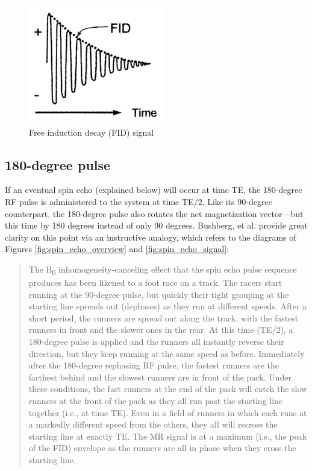 \documentclass[12pt]{article} %
\begin{document}
\begin{figure}[h]
\centering
\includegraphics[scale=1.0]{./images/fid.png}
\caption{Free induction decay (FID) signal \cite{bushberg2002}}
\label{fig:fid}
\end{figure}

\subsection{180-degree pulse}
If an eventual spin echo (explained below) will occur at time TE, the 180-degree RF pulse is administered to the system at time TE/2. Like its 90-degree counterpart, the 180-degree pulse also rotates the net magnetization vector---but this time by 180 degrees instead of only 90 degrees. Bushberg, et al. \cite[p. 391--2]{bushberg2002} provide great clarity on this point via an instructive analogy, which refers to the diagrams of Figures \ref{fig:spin_echo_overview} and \ref{fig:spin_echo_signal}:
\begin{quote}
The B\textsubscript{0} inhomogeneity-canceling effect that the spin echo pulse sequence produces has been likened to a foot race on a track. The racers start running at the 90-degree pulse, but quickly their tight grouping at the starting line spreads out (dephases) as they run at different speeds. After a short period, the runners are spread out along the track, with the fastest runners in front and the slower ones in the rear. At this time (TE/2), a 180-degree pulse is applied and the runners all instantly reverse their direction, but they keep running at the same speed as before. Immediately after the 180-degree rephasing RF pulse, the fastest runners are the farthest behind and the slowest runners are in front of the pack. Under these conditions, the fast runners at the end of the pack will catch the slow runners at the front of the pack as they all run past the starting line together (i.e., at time TE). Even in a field of runners in which each runs at a markedly different speed from the others, they all will recross the starting line at exactly TE. The MR signal is at a maximum (i.e., the peak of the FID) envelope as the runners are all in phase when they cross the starting line.
\end{quote}
\end{document}
